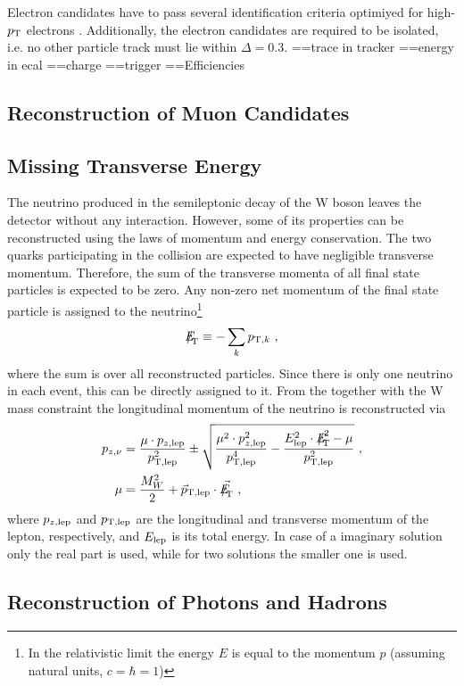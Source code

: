 \noindent Electron candidates have to pass several identification criteria optimiyed for high-$p_{\rm T}$ electrons \cite{elreq}. Additionally, the electron candidates are required to be isolated, i.e. no other particle track must lie within $\Delta=0.3$.
==trace in tracker
==energy in ecal
==charge
==trigger
==Efficiencies
\subsection{Reconstruction of Muon Candidates}
\subsection{Missing Transverse Energy}
The neutrino produced in the semileptonic decay of the W boson leaves the detector without any interaction. However, some of its properties can be reconstructed using the laws of momentum and energy conservation. The two quarks participating in the collision are expected to have negligible transverse momentum. Therefore, the sum of the transverse momenta of all final state particles is expected to be zero. Any non-zero net momentum of the final state particle is assigned to the neutrino\footnote{In the relativistic limit the energy $E$ is equal to the momentum $p$ (assuming natural units, $c=\hbar=1$)}\cite{MET}
\begin{equation}
{E\!\!\!\!/}_{\!\mathrm{T}} \equiv -\sum_k p_{{\rm T},k} ~,
\end{equation}
where the sum is over all reconstructed particles. Since there is only one neutrino in each event, this \MET can be directly assigned to it. From the \MET together with the W mass constraint the longitudinal momentum of the neutrino is reconstructed \cite{PAS} via
\begin{align}
p_{z,\nu} &= \frac{\mu \cdot p_{z,{\rm lep}}}{p_{\rm T,lep}^2} \pm \sqrt{\frac{\mu^2 \cdot p_{z,{\rm lep}}^2}{p_{\rm T,lep}^4} - \frac{E_{\rm lep}^2 \cdot \MET^2 - \mu}{p_{\rm T,lep}^2}} ~, \\
\mu &= \frac{M_W^2}{2} + \vec{p}_{\rm T,lep}\cdot \vec{\MET} ~,
\end{align} 
where $p_{z,{\rm lep}}$ and $p_{\rm T,lep}$ are the longitudinal  and transverse momentum of the lepton, respectively, and $E_{\rm lep}$ is its total energy. In case of a imaginary solution only the real part is used, while for two solutions the smaller one is used.
\subsection{Reconstruction of Photons and Hadrons}
